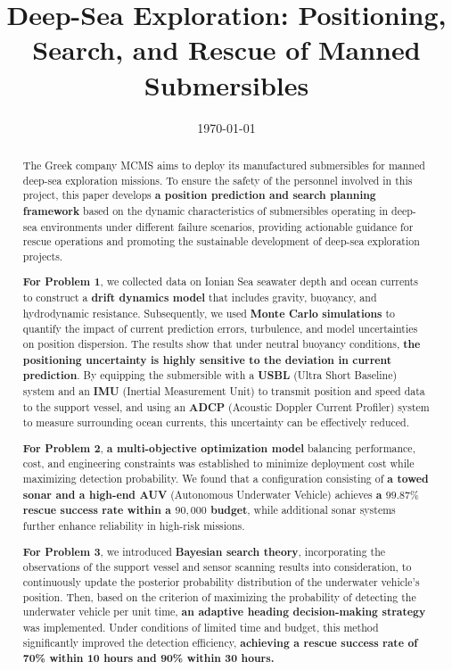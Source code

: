 \documentclass{mcmthesis}
\title{Deep-Sea Exploration: Positioning, Search, and Rescue of Manned Submersibles}
\date{\today}
\begin{document}
\begin{abstract}
The Greek company MCMS aims to deploy its manufactured submersibles for manned deep-sea exploration missions.
To ensure the safety of the personnel involved in this project, this paper develops \textbf{a position prediction and search planning framework}
based on the dynamic characteristics of submersibles operating in deep-sea environments
under different failure scenarios,
providing actionable guidance for rescue operations and promoting the sustainable development of deep-sea exploration projects.

\textbf{For Problem 1}, we collected data on Ionian Sea seawater depth and ocean currents to construct a \textbf{drift dynamics model} that includes gravity, buoyancy, and hydrodynamic resistance.
Subsequently, we used \textbf{Monte Carlo simulations} to quantify the impact of current prediction errors, turbulence, and model uncertainties on position dispersion. 
The results show that under neutral buoyancy conditions, \textbf{the positioning uncertainty is highly sensitive to the deviation in current prediction}. 
By equipping the submersible with a \textbf{USBL} (Ultra Short Baseline) system and an \textbf{IMU} (Inertial Measurement Unit) to transmit position and speed data to the support vessel, and using an \textbf{ADCP} (Acoustic Doppler Current Profiler) system to measure surrounding ocean currents, this uncertainty can be effectively reduced.

\textbf{For Problem 2}, \textbf{a multi-objective optimization model} balancing performance, cost, and engineering constraints was established to minimize deployment cost while maximizing 
detection probability. We found that a configuration consisting of \textbf{a towed sonar and a high-end AUV} (Autonomous Underwater Vehicle) achieves 
\textbf{a $99.87\%$ rescue success rate within a $90{,}000$ budget}, while additional sonar systems further enhance reliability in high-risk missions.

\textbf{For Problem 3}, we introduced \textbf{Bayesian search theory}, incorporating the observations of the support vessel and sensor scanning results into consideration,
to continuously update the posterior probability distribution of the underwater vehicle's position.
Then, based on the criterion of maximizing the probability of detecting the underwater vehicle per unit time, \textbf{an adaptive heading decision-making strategy} was implemented.
Under conditions of limited time and budget, this method significantly improved the detection efficiency,
\textbf{achieving a rescue success rate of 70\% within 10 hours and 90\% within 30 hours.}


\end{abstract}
\end{document}
